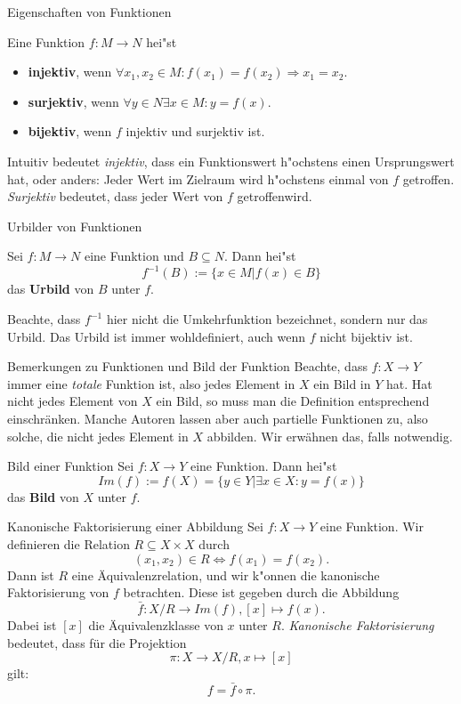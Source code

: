 \documentclass{beamer}
\begin{document}
  
\begin{frame}{Eigenschaften von Funktionen}
\begin{definition}
  Eine Funktion $f:M\to N$ hei"st 
  \begin{itemize}
    \item \textbf{injektiv}, wenn $\forall x_1,x_2\in M:f(x_1)=f(x_2)\Rightarrow x_1=x_2$.
    \item \textbf{surjektiv}, wenn $\forall y\in N\exists x\in M:y=f(x)$.
    \item \textbf{bijektiv}, wenn $f$ injektiv und surjektiv ist.
  \end{itemize}
\end{definition}
Intuitiv bedeutet \textit{injektiv}, dass ein Funktionswert h"ochstens einen Ursprungswert hat, oder anders: Jeder Wert im Zielraum wird h"ochstens einmal von $f$ \glqq getroffen\grqq. \textit{Surjektiv} bedeutet, dass jeder Wert von $f$ \glqq getroffen\grqq wird.
\end{frame}
\begin{frame}{Urbilder von Funktionen}
  \begin{definition}[Urbild]
    Sei $f:M\to N$ eine Funktion und $B\subseteq N$. Dann hei"st \[f^{-1}(B):=\{x\in M|f(x)\in B\}\] das \textbf{Urbild} von $B$ unter $f$.
  \end{definition}
  Beachte, dass $f^{-1}$ hier nicht die Umkehrfunktion bezeichnet, sondern nur das Urbild. Das Urbild ist immer wohldefiniert, auch wenn $f$ nicht bijektiv ist.
  \end{frame}

\begin{frame}{Bemerkungen zu Funktionen und Bild der Funktion}
Beachte, dass $f:X\to Y$ immer eine \textit{totale} Funktion ist, also jedes Element in $X$ ein Bild in $Y$ hat. Hat nicht jedes Element von $X$ ein Bild, so muss man die Definition entsprechend einschränken. Manche Autoren lassen aber auch partielle Funktionen zu, also solche, die nicht jedes Element in $X$ abbilden. Wir erwähnen das, falls notwendig.

\begin{definition}{Bild einer Funktion}
  Sei $f:X\to Y$ eine Funktion. Dann hei"st \[Im(f):=f(X)=\{y\in Y|\exists x\in X:y=f(x)\}\] das \textbf{Bild} von $X$ unter $f$.
\end{definition}
\end{frame}
\begin{frame}{Kanonische Faktorisierung einer Abbildung}
  Sei $f:X\to Y$ eine Funktion. Wir definieren die Relation $R\subseteq X\times X$ durch \[(x_1,x_2)\in R\Leftrightarrow f(x_1)=f(x_2).\] Dann ist $R$ eine \"Aquivalenzrelation, und wir k"onnen die kanonische Faktorisierung von $f$ betrachten. Diese ist gegeben durch die Abbildung \[\bar{f}:X/R\to Im(f), [x]\mapsto f(x).\] Dabei ist $[x]$ die \"Aquivalenzklasse von $x$ unter $R$.
  \textit{Kanonische Faktorisierung} bedeutet, dass f\"ur die Projektion \[\pi:X\to X/R, x\mapsto[x]\] gilt: \[f=\bar{f}\circ\pi.\]
\end{frame}
\end{document}
